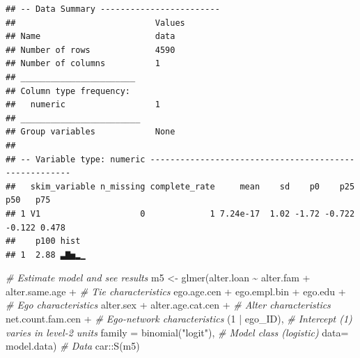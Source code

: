 \documentclass[
]{book}
\newenvironment{Shaded}{\begin{snugshade}}{\end{snugshade}}
\newcommand{\AttributeTok}[1]{\textcolor[rgb]{0.77,0.63,0.00}{#1}}
\newcommand{\CommentTok}[1]{\textcolor[rgb]{0.56,0.35,0.01}{\textit{#1}}}
\newcommand{\DecValTok}[1]{\textcolor[rgb]{0.00,0.00,0.81}{#1}}
\newcommand{\DocumentationTok}[1]{\textcolor[rgb]{0.56,0.35,0.01}{\textbf{\textit{#1}}}}
\newcommand{\FunctionTok}[1]{\textcolor[rgb]{0.00,0.00,0.00}{#1}}
\newcommand{\NormalTok}[1]{#1}
\newcommand{\OtherTok}[1]{\textcolor[rgb]{0.56,0.35,0.01}{#1}}
\newcommand{\SpecialCharTok}[1]{\textcolor[rgb]{0.00,0.00,0.00}{#1}}
\newcommand{\StringTok}[1]{\textcolor[rgb]{0.31,0.60,0.02}{#1}}
\begin{document}
\begin{Shaded}
\end{Shaded}

\begin{verbatim}
## -- Data Summary ------------------------
##                            Values
## Name                       data  
## Number of rows             4590  
## Number of columns          1     
## _______________________          
## Column type frequency:           
##   numeric                  1     
## ________________________         
## Group variables            None  
## 
## -- Variable type: numeric ------------------------------------------------------
##   skim_variable n_missing complete_rate     mean    sd    p0    p25    p50   p75
## 1 V1                    0             1 7.24e-17  1.02 -1.72 -0.722 -0.122 0.478
##    p100 hist 
## 1  2.88 ▃▇▅▂▁
\end{verbatim}

\begin{Shaded}
\begin{Highlighting}[]
\CommentTok{\# Estimate model and see results}
\NormalTok{m5 }\OtherTok{\textless{}{-}} \FunctionTok{glmer}\NormalTok{(alter.loan }\SpecialCharTok{\textasciitilde{}}\NormalTok{ alter.fam }\SpecialCharTok{+}\NormalTok{ alter.same.age }\SpecialCharTok{+} \CommentTok{\# Tie characteristics}
\NormalTok{              ego.age.cen }\SpecialCharTok{+}\NormalTok{ ego.empl.bin }\SpecialCharTok{+}\NormalTok{ ego.edu }\SpecialCharTok{+} \CommentTok{\# Ego characteristics}
\NormalTok{              alter.sex }\SpecialCharTok{+}\NormalTok{ alter.age.cat.cen }\SpecialCharTok{+}  \CommentTok{\# Alter characteristics}
\NormalTok{              net.count.fam.cen }\SpecialCharTok{+} \CommentTok{\# Ego{-}network characteristics}
\NormalTok{              (}\DecValTok{1} \SpecialCharTok{|}\NormalTok{ ego\_ID), }\CommentTok{\# Intercept (1) varies in level{-}2 units}
            \AttributeTok{family =} \FunctionTok{binomial}\NormalTok{(}\StringTok{"logit"}\NormalTok{), }\CommentTok{\# Model class (logistic)}
            \AttributeTok{data=}\NormalTok{ model.data) }\CommentTok{\# Data}
\NormalTok{car}\SpecialCharTok{::}\FunctionTok{S}\NormalTok{(m5)}
\end{Highlighting}
\end{Shaded}
\end{document}

